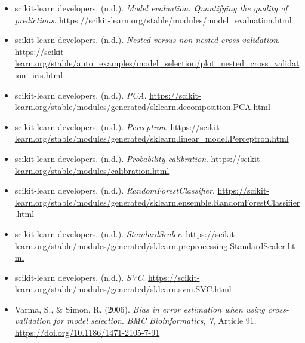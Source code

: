 \begin{itemize}
    \item scikit-learn developers. (n.d.). \emph{Model evaluation: Quantifying the quality of predictions}. \url{https://scikit-learn.org/stable/modules/model_evaluation.html}
    \item scikit-learn developers. (n.d.). \emph{Nested versus non-nested cross-validation}. \url{https://scikit-learn.org/stable/auto_examples/model_selection/plot_nested_cross_validation_iris.html}
    \item scikit-learn developers. (n.d.). \emph{PCA}. \url{https://scikit-learn.org/stable/modules/generated/sklearn.decomposition.PCA.html}
    \item scikit-learn developers. (n.d.). \emph{Perceptron}. \url{https://scikit-learn.org/stable/modules/generated/sklearn.linear_model.Perceptron.html}
    \item scikit-learn developers. (n.d.). \emph{Probability calibration}. \url{https://scikit-learn.org/stable/modules/calibration.html}
    \item scikit-learn developers. (n.d.). \emph{RandomForestClassifier}. \url{https://scikit-learn.org/stable/modules/generated/sklearn.ensemble.RandomForestClassifier.html}
    \item scikit-learn developers. (n.d.). \emph{StandardScaler}. \url{https://scikit-learn.org/stable/modules/generated/sklearn.preprocessing.StandardScaler.html}
    \item scikit-learn developers. (n.d.). \emph{SVC}. \url{https://scikit-learn.org/stable/modules/generated/sklearn.svm.SVC.html}
    \item Varma, S., \& Simon, R. (2006). \emph{Bias in error estimation when using cross-validation for model selection}. \emph{BMC Bioinformatics, 7}, Article 91.\\ \url{https://doi.org/10.1186/1471-2105-7-91}
\end{itemize}
